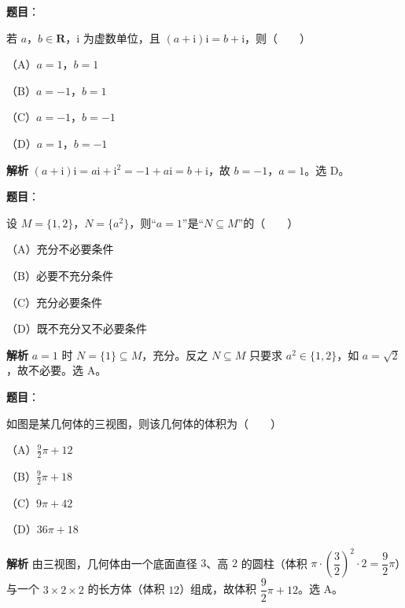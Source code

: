 
\begin{answer}

\textbf{题目}：

若 $a$，$b\in\mathbf R$，$\mathrm i$ 为虚数单位，且 $(a+\mathrm i)\mathrm i=b+\mathrm i$，则\mbox{（　　）}

（A）$a=1$，$b=1$

（B）$a=-1$，$b=1$

（C）$a=-1$，$b=-1$

（D）$a=1$，$b=-1$

\textbf{解析}
$(a+\mathrm i)\mathrm i=a\mathrm i+\mathrm i^2=-1+a\mathrm i=b+\mathrm i$，故 $b=-1$，$a=1$。选 D。


\end{answer}
\begin{answer}

\textbf{题目}：

设 $M=\{1,2\}$，$N=\{a^2\}$，则“$a=1$”是“$N\subseteq M$”的\mbox{（　　）}

（A）充分不必要条件

（B）必要不充分条件

（C）充分必要条件

（D）既不充分又不必要条件

\textbf{解析}
$a=1$ 时 $N=\{1\}\subseteq M$，充分。反之 $N\subseteq M$ 只要求 $a^2\in\{1,2\}$，如 $a=\sqrt2$，故不必要。选 A。


\end{answer}
\begin{answer}

\textbf{题目}：

如图是某几何体的三视图，则该几何体的体积为\mbox{（　　）}

（A）$\frac92\pi+12$

（B）$\frac92\pi+18$

（C）$9\pi+42$

（D）$36\pi+18$
\nopagebreak[4]
\begin{center}\end{center}
\nopagebreak[4]
\textbf{解析}
由三视图，几何体由一个底面直径 $3$、高 $2$ 的圆柱（体积 $\pi\cdot\left(\dfrac32\right)^2\cdot2=\dfrac92\pi$）与一个 $3\times2\times2$ 的长方体（体积 $12$）组成，故体积 $\dfrac92\pi+12$。选 A。


\end{answer}
